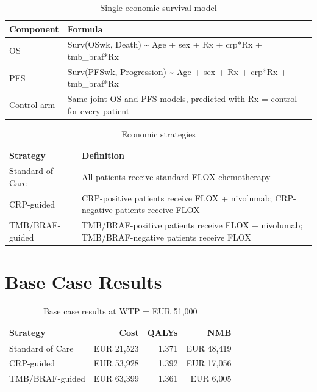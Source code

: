 \documentclass[
  11pt,
  a4paper]{article}
\begin{document}
\begin{table}[H]

\caption{Single economic survival model}
\centering
\begin{tabular}[t]{l>{\raggedright\arraybackslash}p{10cm}}
\toprule
Component & Formula\\
\midrule
OS & Surv(OSwk, Death) \textasciitilde{} Age + sex + Rx + crp*Rx + tmb\_braf*Rx\\
PFS & Surv(PFSwk, Progression) \textasciitilde{} Age + sex + Rx + crp*Rx + tmb\_braf*Rx\\
Control arm & Same joint OS and PFS models, predicted with Rx = control for every patient\\
\bottomrule
\end{tabular}
\end{table}

\begin{table}[H]

\caption{Economic strategies}
\centering
\begin{tabular}[t]{l>{\raggedright\arraybackslash}p{10cm}}
\toprule
Strategy & Definition\\
\midrule
Standard of Care & All patients receive standard FLOX chemotherapy\\
CRP-guided & CRP-positive patients receive FLOX + nivolumab; CRP-negative patients receive FLOX\\
TMB/BRAF-guided & TMB/BRAF-positive patients receive FLOX + nivolumab; TMB/BRAF-negative patients receive FLOX\\
\bottomrule
\end{tabular}
\end{table}

\section{Base Case Results}\label{base-case-results}

\begin{table}[H]

\caption{Base case results at WTP = EUR 51,000}
\centering
\begin{tabular}[t]{lrrr}
\toprule
Strategy & Cost & QALYs & NMB\\
\midrule
Standard of Care & EUR 21,523 & 1.371 & EUR 48,419\\
CRP-guided & EUR 53,928 & 1.392 & EUR 17,056\\
TMB/BRAF-guided & EUR 63,399 & 1.361 & EUR 6,005\\
\bottomrule
\end{tabular}
\end{table}
\end{document}
